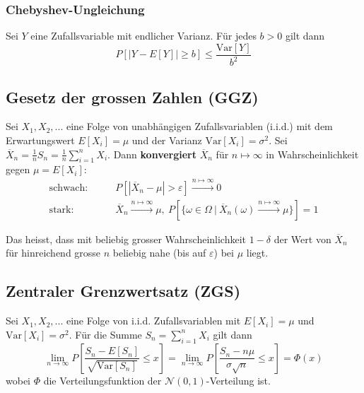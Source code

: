 \documentclass[11pt]{article}
\newcommand{\Var}{\text{Var}}
\begin{document}
\subsubsection{Chebyshev-Ungleichung}

Sei $Y$ eine Zufallsvariable mit endlicher Varianz. F{\"u}r jedes $b > 0$ gilt dann
\begin{equation*}
	P[|Y - E[Y]| \geq b] \leq \frac{\Var[Y]}{b^2}
\end{equation*}

\subsection{Gesetz der grossen Zahlen (GGZ)}

Sei $X_1, X_2, ...$ eine Folge von unabh{\"a}ngigen Zufallsvariablen (i.i.d.) mit dem Erwartungswert $E[X_i] = \mu$ und der Varianz $\Var[X_i] = \sigma^2$. Sei $\overline{X}_n = \frac{1}{n}S_n = \frac{1}{n}\sum_{i=1}^n X_i$. Dann \textbf{konvergiert} $\overline{X}_n$ f{\"u}r $n \mapsto \infty$ in Wahrscheinlichkeit gegen $\mu = E[X_i]$:
\begin{equation*}
\begin{split}
	\text{schwach:} & \qquad P[|\overline{X}_n - \mu| > \varepsilon] \xrightarrow{n \mapsto \infty} 0 \\
	\text{stark:} & \qquad \overline{X}_n \xrightarrow{n\mapsto\infty}\mu,\ P[\{\omega \in \Omega\ |\  \overline{X}_n(\omega) \xrightarrow{n\mapsto\infty}\mu\}] = 1 
\end{split}
\end{equation*}

Das heisst, dass mit beliebig grosser Wahrscheinlichkeit $1- \delta$ der Wert von $\overline{X}_n$ f{\"u}r hinreichend grosse $n$ beliebig nahe (bis auf $\varepsilon$) bei $\mu$ liegt.

\subsection{Zentraler Grenzwertsatz (ZGS)}

Sei $X_1, X_2, ...$ eine Folge von i.i.d. Zufallsvariablen mit $E[X_i] = \mu$ und $\Var[X_i] = \sigma^2$. F{\"u}r die Summe $S_n = \sum_{i=1}^n X_i$ gilt dann
\begin{equation*}
	\lim_{n\rightarrow\infty} P[\frac{S_n - E[S_n]}{\sqrt{\Var[S_n]}} \leq x] =	\lim_{n\rightarrow\infty} P[\frac{S_n - n\mu}{\sigma \sqrt{n}} \leq x] = \Phi(x)
\end{equation*}
wobei $\Phi$ die Verteilungsfunktion der $\mathcal{N}(0,1)$-Verteilung ist.
\end{document}
